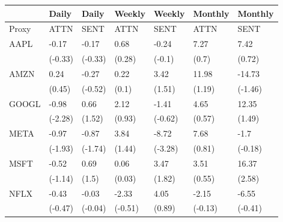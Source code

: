 \begin{tabular}{lllllll}
\toprule
{} &    Daily &    Daily &   Weekly &   Weekly &  Monthly &  Monthly \\
\midrule
Proxy &     ATTN &     SENT &     ATTN &     SENT &     ATTN &     SENT \\
AAPL  &    -0.17 &    -0.17 &     0.68 &    -0.24 &     7.27 &     7.42 \\
      &  (-0.33) &  (-0.33) &   (0.28) &   (-0.1) &    (0.7) &   (0.72) \\
AMZN  &     0.24 &    -0.27 &     0.22 &     3.42 &    11.98 &   -14.73 \\
      &   (0.45) &  (-0.52) &    (0.1) &   (1.51) &   (1.19) &  (-1.46) \\
GOOGL &    -0.98 &     0.66 &     2.12 &    -1.41 &     4.65 &    12.35 \\
      &  (-2.28) &   (1.52) &   (0.93) &  (-0.62) &   (0.57) &   (1.49) \\
META  &    -0.97 &    -0.87 &     3.84 &    -8.72 &     7.68 &     -1.7 \\
      &  (-1.93) &  (-1.74) &   (1.44) &  (-3.28) &   (0.81) &  (-0.18) \\
MSFT  &    -0.52 &     0.69 &     0.06 &     3.47 &     3.51 &    16.37 \\
      &  (-1.14) &    (1.5) &   (0.03) &   (1.82) &   (0.55) &   (2.58) \\
NFLX  &    -0.43 &    -0.03 &    -2.33 &     4.05 &    -2.15 &    -6.55 \\
      &  (-0.47) &  (-0.04) &  (-0.51) &   (0.89) &  (-0.13) &  (-0.41) \\
\bottomrule
\end{tabular}
